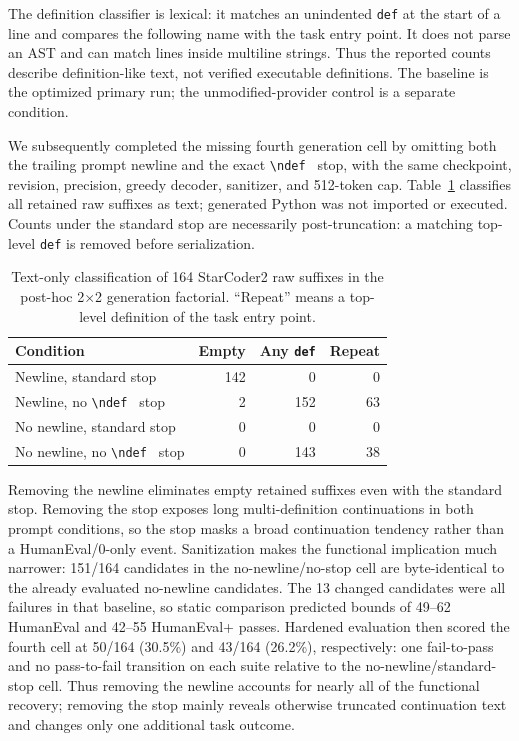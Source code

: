 \documentclass[10pt,twocolumn]{article}
\newcommand{\code}[1]{\texttt{#1}}
\begin{document}
The definition classifier is lexical: it matches an unindented \code{def} at
the start of a line and compares the following name with the task entry point.
It does not parse an AST and can match lines inside multiline strings. Thus
the reported counts describe definition-like text, not verified executable
definitions. The baseline is the optimized primary run; the unmodified-provider
control is a separate condition.

We subsequently completed the missing fourth generation cell by omitting both the trailing prompt newline and the exact \code{\textbackslash ndef } stop, with the same checkpoint, revision, precision, greedy decoder, sanitizer, and 512-token cap. Table~\ref{tab:factorial} classifies all retained raw suffixes as text; generated Python was not imported or executed. Counts under the standard stop are necessarily post-truncation: a matching top-level \code{def} is removed before serialization.

\begin{table}[t]
\centering
\caption{Text-only classification of 164 StarCoder2 raw suffixes in the post-hoc 2$\times$2 generation factorial. ``Repeat'' means a top-level definition of the task entry point.}
\label{tab:factorial}
\scriptsize
\begin{tabularx}{\columnwidth}{@{}Xrrr@{}}
\toprule
Condition & Empty & Any \code{def} & Repeat \\
\midrule
Newline, standard stop & 142 & 0 & 0 \\
Newline, no \code{\textbackslash ndef } stop & 2 & 152 & 63 \\
No newline, standard stop & 0 & 0 & 0 \\
No newline, no \code{\textbackslash ndef } stop & 0 & 143 & 38 \\
\bottomrule
\end{tabularx}
\end{table}

Removing the newline eliminates empty retained suffixes even with the standard stop. Removing the stop exposes long multi-definition continuations in both prompt conditions, so the stop masks a broad continuation tendency rather than a HumanEval/0-only event. Sanitization makes the functional implication much narrower: 151/164 candidates in the no-newline/no-stop cell are byte-identical to the already evaluated no-newline candidates. The 13 changed candidates were all failures in that baseline, so static comparison predicted bounds of 49--62 HumanEval and 42--55 HumanEval+ passes. Hardened evaluation then scored the fourth cell at 50/164 (30.5\%) and 43/164 (26.2\%), respectively: one fail-to-pass and no pass-to-fail transition on each suite relative to the no-newline/standard-stop cell. Thus removing the newline accounts for nearly all of the functional recovery; removing the stop mainly reveals otherwise truncated continuation text and changes only one additional task outcome.
\end{document}
